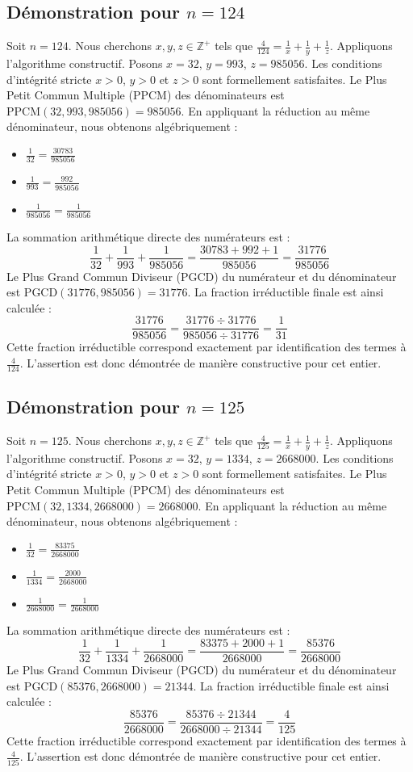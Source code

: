 \documentclass[11pt,a4paper]{article}
\begin{document}
\subsection{Démonstration pour $n = 124$}
Soit $n = 124$. Nous cherchons $x, y, z \in \mathbb{Z}^{+}$ tels que $\frac{4}{124} = \frac{1}{x} + \frac{1}{y} + \frac{1}{z}$.
Appliquons l'algorithme constructif. Posons $x = 32$, $y = 993$, $z = 985056$.
Les conditions d'intégrité stricte $x > 0$, $y > 0$ et $z > 0$ sont formellement satisfaites.
Le Plus Petit Commun Multiple (PPCM) des dénominateurs est $\text{PPCM}(32, 993, 985056) = 985056$.
En appliquant la réduction au même dénominateur, nous obtenons algébriquement :
\begin{itemize}
    \item $\frac{1}{32} = \frac{30783}{985056}$
    \item $\frac{1}{993} = \frac{992}{985056}$
    \item $\frac{1}{985056} = \frac{1}{985056}$
\end{itemize}
La sommation arithmétique directe des numérateurs est :
$$ \frac{1}{32} + \frac{1}{993} + \frac{1}{985056} = \frac{30783 + 992 + 1}{985056} = \frac{31776}{985056} $$
Le Plus Grand Commun Diviseur (PGCD) du numérateur et du dénominateur est $\text{PGCD}(31776, 985056) = 31776$.
La fraction irréductible finale est ainsi calculée :
$$ \frac{31776}{985056} = \frac{31776 \div 31776}{985056 \div 31776} = \frac{1}{31} $$
Cette fraction irréductible correspond exactement par identification des termes à $\frac{4}{124}$. L'assertion est donc démontrée de manière constructive pour cet entier.

\subsection{Démonstration pour $n = 125$}
Soit $n = 125$. Nous cherchons $x, y, z \in \mathbb{Z}^{+}$ tels que $\frac{4}{125} = \frac{1}{x} + \frac{1}{y} + \frac{1}{z}$.
Appliquons l'algorithme constructif. Posons $x = 32$, $y = 1334$, $z = 2668000$.
Les conditions d'intégrité stricte $x > 0$, $y > 0$ et $z > 0$ sont formellement satisfaites.
Le Plus Petit Commun Multiple (PPCM) des dénominateurs est $\text{PPCM}(32, 1334, 2668000) = 2668000$.
En appliquant la réduction au même dénominateur, nous obtenons algébriquement :
\begin{itemize}
    \item $\frac{1}{32} = \frac{83375}{2668000}$
    \item $\frac{1}{1334} = \frac{2000}{2668000}$
    \item $\frac{1}{2668000} = \frac{1}{2668000}$
\end{itemize}
La sommation arithmétique directe des numérateurs est :
$$ \frac{1}{32} + \frac{1}{1334} + \frac{1}{2668000} = \frac{83375 + 2000 + 1}{2668000} = \frac{85376}{2668000} $$
Le Plus Grand Commun Diviseur (PGCD) du numérateur et du dénominateur est $\text{PGCD}(85376, 2668000) = 21344$.
La fraction irréductible finale est ainsi calculée :
$$ \frac{85376}{2668000} = \frac{85376 \div 21344}{2668000 \div 21344} = \frac{4}{125} $$
Cette fraction irréductible correspond exactement par identification des termes à $\frac{4}{125}$. L'assertion est donc démontrée de manière constructive pour cet entier.
\end{document}
